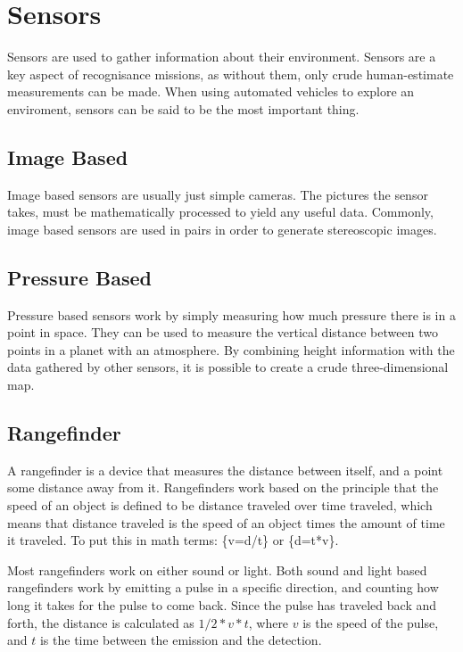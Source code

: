 \clearpageg
\section{Sensors}
Sensors are used to gather information about their environment. Sensors are a key aspect of recognisance missions, as without them, only crude human-estimate measurements can be made. When using automated vehicles to explore an enviroment, sensors can be said to be the most important thing.

\subsection{Image Based}
Image based sensors are usually just simple cameras. The pictures the sensor takes, must be mathematically processed to yield any useful data. Commonly, image based sensors are used in pairs in order to generate stereoscopic images.

\subsection{Pressure Based}
Pressure based sensors work by simply measuring how much pressure there is in a point in space. They can be used to measure the vertical distance between two points in a planet with an atmosphere\cite{barometric1}\cite{barometric2}. By combining height information with the data gathered by other sensors, it is possible to create a crude three-dimensional map.

\subsection{Rangefinder}%
A rangefinder is a device that measures the distance between itself, and a point some distance away from it. Rangefinders work based on the principle that the speed of an object is defined to be distance traveled over time traveled, which means that distance traveled is the speed of an object times the amount of time it traveled. To put this in math terms: \{v=d/t\} or \{d=t*v\}.

Most rangefinders work on either sound or light. Both sound and light based rangefinders work by emitting a pulse in a specific direction, and counting how long it takes for the pulse to come back. Since the pulse has traveled back and forth, the distance is calculated as \(1/2*v*t\), where \(v\) is the speed of the pulse, and \(t\) is the time between the emission and the detection.

